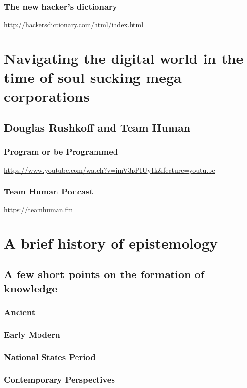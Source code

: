 \documentclass[11pt]{article}
\begin{document}
\subsubsection{The new hacker's dictionary}
\label{sec:org8a0a1ee}
\url{http://hackersdictionary.com/html/index.html}

\section{Navigating the digital world in the time of soul sucking mega corporations}
\label{sec:org07a9293}

\subsection{Douglas Rushkoff and Team Human}
\label{sec:org127db40}
\subsubsection{Program or be Programmed}
\label{sec:org50ccc62}
\url{https://www.youtube.com/watch?v=imV3pPIUy1k\&feature=youtu.be}

\subsubsection{Team Human Podcast}
\label{sec:orga913c9f}
\url{https://teamhuman.fm}

\section{A brief history of epistemology}
\label{sec:org815a1e6}
\subsection{A few short points on the formation of knowledge}
\label{sec:orga48e398}
\subsubsection{Ancient}
\label{sec:org81c5d2b}
\subsubsection{Early Modern}
\label{sec:org3e9b4d0}
\subsubsection{National States Period}
\label{sec:orgcbe66ab}
\subsubsection{Contemporary Perspectives}
\label{sec:org06f58d8}
\end{document}
